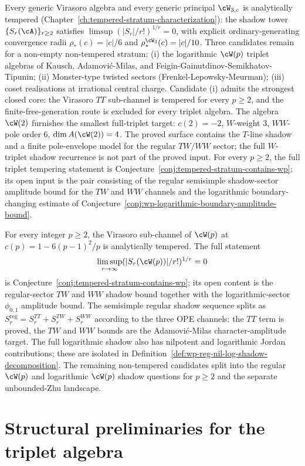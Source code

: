 Every generic Virasoro algebra and every generic principal
$\cW_{3,c}$ is analytically tempered
(Chapter~\ref{ch:tempered-stratum-characterization}): the shadow tower
$\{S_r(\cA)\}_{r \ge 2}$ satisfies
$\limsup (\lvert S_r \rvert / r!)^{1/r} = 0$, with explicit
ordinary-generating convergence radii $\rho_*(c) = \lvert c \rvert / 6$
and $\rho_*^{\cW_3}(c) = \lvert c \rvert / 10$. Three candidates remain
for a non-empty non-tempered stratum: (i) the logarithmic
$\cW(p)$ triplet algebras of Kausch, Adamovi\'c-Milas, and
Feigin-Gainutdinov-Semikhatov-Tipunin; (ii) Monster-type twisted
sectors (Frenkel-Lepowsky-Meurman); (iii) coset realisations at
irrational central charge. Candidate (i) admits the strongest closed
core: the Virasoro $TT$ sub-channel is tempered for every $p \ge 2$,
and the finite-free-generation route is excluded for every triplet
algebra. The algebra $\cW(2)$ furnishes the smallest full-triplet
target: $c(2)=-2$, $W$-weight $3$, $WW$-pole order $6$,
$\dim A(\cW(2))=4$. The proved surface contains the $T$-line shadow
and a finite pole-envelope model for the regular $TW/WW$ sector;
the full $W$-triplet shadow recurrence is not part of the proved
input. For every $p \ge 2$,
the full triplet tempering statement is
Conjecture~\ref{conj:tempered-stratum-contains-wp}; its open input is
the pair consisting of the regular semisimple shadow-sector amplitude
bound for the $TW$ and $WW$ channels and the logarithmic
boundary-changing estimate of
Conjecture~\ref{conj:wp-logarithmic-boundary-amplitude-bound}.

For every integer $p \ge 2$, the Virasoro sub-channel of
$\cW(p)$ at $c(p) = 1 - 6(p-1)^2/p$ is analytically tempered. The
full statement
\[
 \limsup_{r \to \infty}(\lvert S_r(\cW(p))\rvert/r!)^{1/r}=0
\]
is Conjecture~\ref{conj:tempered-stratum-contains-wp}; its open
content is the regular-sector $TW$ and $WW$ shadow bound together with
the logarithmic-sector $\phi_{0,1}$ amplitude bound. The semisimple
regular shadow sequence splits as
$S_r^{\mathrm{reg}} = S_r^{TT} + S_r^{TW} + S_r^{WW}$ according to the
three OPE channels: the $TT$ term is proved, the $TW$ and $WW$ bounds
are the Adamovi\'c-Milas character-amplitude target. The full
logarithmic shadow also has nilpotent and logarithmic Jordan
contributions; these are isolated in
Definition~\ref{def:wp-reg-nil-log-shadow-decomposition}.
The remaining non-tempered candidates split into the regular $\cW(p)$
and logarithmic $\cW(p)$ shadow questions for $p \ge 2$ and the
separate unbounded-Zhu landscape.

\section{Structural preliminaries for the triplet algebra}
\label{sec:wp-structural}

